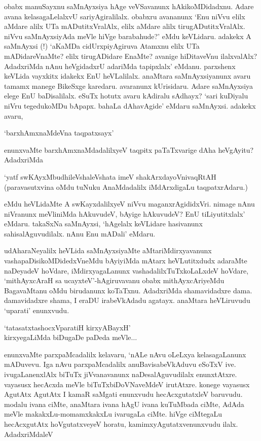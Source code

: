 obabx manuSayxnu saMnAyxsiya hAge veVSavanunx hAkikoMDidadxnu. Adare avana kelasagaLelalxvU sariyAgiralilalx. obabxru avananunx `Enu niVvu elilx aMdare alilx UTa mADutitxVralAlx, elilx aMdare alilx tirugADutitxVralAlx. niVvu saMnAyxsiyAda meVle hiVge barabahude?' eMdu keVLidaru. adakekx A saMnAyxsi (!) `aKaMDa cidUrxpiyAgiruva Atamxnu elilx UTa mADidareVnaMte? elilx tirugADidare EnaMte? avanige hiDitaveVnu ilalxvalAlx? AdadxriMda nAnu heVgidadxrU adariMda tapipxlalx' eMdanu. parxshenx keVLida vayxkitx idakekx EnU heVLalilalx. anaMtara saMnAyxsiyanunx avaru tamamx manege BikeSxge karedaru. avaranunx kUrisidaru. Adare saMnAyxsiya elege EnU baDisalilalx. eSuTx hotutx avaru kAdiralu sAdhayx? `sari kuDiyalu niVru tegedukoMDu bApapx. bahaLa dAhavAgide' eMdaru saMnAyxsi. adakekx avaru,

\begin{shloka}
`barxhAmxnaMdeVna taqpatxsayx'
\end{shloka}

enunxvaMte barxhAmxnaMdadalilxyeV taqpitx paTaTxvarige dAha heVgAyitu? AdadxriMda

\begin{shloka}
`yatf swKAyxMbudhileVshaleVshata imeV shakArxdayoVnivaqRtAH\\
(paravasutxvina oMdu tuNuku AnaMdadalilx iMdArxdigaLu taqpatxrAdaru.)
\end{shloka}

\noindent eMdu heVLidaMte A swKayxdalilxyeV niVvu maganxrAgididxVri. nimage nAnu niVranunx meVliniMda hAkuvudeV, bAyige hAkuvudeV? EnU tiLiyutitxlalx' eMdaru. takaSxNa saMnAyxsi, `hAgelalx keVLidare hasivanunx sahisalAguvudilalx. nAnu Enu mADali' eMdaru.

udAharaNeyalilx heVLida saMnAyxsiyaMte aMtariMdirxyavanunx vashapaDisikoMDidedxVneMdu bAyiyiMda mAtarx heVLutitxdudx adaraMte naDeyadeV hoVdare, iMdirxyagaLanunx vashadalilxTuTxkoLaLxdeV hoVdare, `mithAyxcAraH sa ucayxteV'-hAgiruvavanu obabx mithAyxcAriyeMdu BagavaMtanu oMdu birudanunx koTaTxnu. AdadxriMda shamavidadxre dama. damavidadxre shama, I eraDU irabeVkAdadu agatayx. anaMtara heVLiruvudu `uparati' enunxvudu.

\begin{shloka}
`tatasatxtashocxVparatiH kirxyABayxH'\\
kirxyegaLiMda biDugaDe paDeda meVle$\ldots$ 
\end{shloka}

\noindent enunxvaMte parxpaMcadalilx kelavaru, `nALe nAvu oLeLxya kelasagaLanunx mADuvevu. Iga nAvu parxpaMcadalilx anuBavisabeVkAduvu eSoTxV ive. ivugaLanenxlAlx biTuTx jiVvanavanunx naDesalAguvudilalx enunxtAtxre. vayasusx hecAcxda meVle biTuTxbiDoVNaveMdeV irutAtxre. konege vayasusx AgutAtx AgutAtx I kamaR saMgati enunxvudu hecAcxgutatxleV baruvudu. modalu ivana ciMte, anaMtara ivana hAgU ivana kuTuMbada ciMte, AdAda meVle makakxLu-momamxkakxLu ivarugaLa ciMte. hiVge ciMtegaLu hecAcxgutAtx hoVgutatxveyeV horatu, kamimxyAgutatxvenunxvudu ilalx. AdadxriMdaleV

